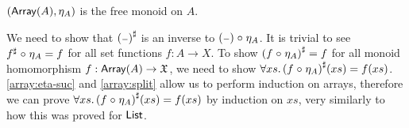 \begin{propositionrep}\label{array:univ}
    $(\operatorname{\mathsf{Array}}(A),\eta_A)$ is the free monoid on $A$.
\end{propositionrep}

\begin{proofsketch}
    We need to show that ${({\scriptstyle{-}})}^{\sharp}$ is an inverse to $({\scriptstyle{-}}) \mathrel{\circ} \eta_A$.
    It is trivial to see ${f}^{\sharp} \mathrel{\circ} \eta_A = f$ for all set functions $f : A \to X$.
    To show ${(f \mathrel{\circ} \eta_A)}^{\sharp} = f$ for all monoid homomorphism $f : \operatorname{\mathsf{Array}}(A) \to \mathfrak{X}$,
    we need to show $\forall xs.\, {(f \mathrel{\circ} \eta_A)}^{\sharp}(xs) = f(xs)$.
    \cref{array:eta-suc} and \cref{array:split} allow us to perform induction on arrays,
    therefore we can prove $\forall xs.\, {(f \mathrel{\circ} \eta_A)}^{\sharp}(xs) = f(xs)$ by induction on $xs$,
    very similarly to how this was proved for $\operatorname{\mathsf{List}}$.
\end{proofsketch}

